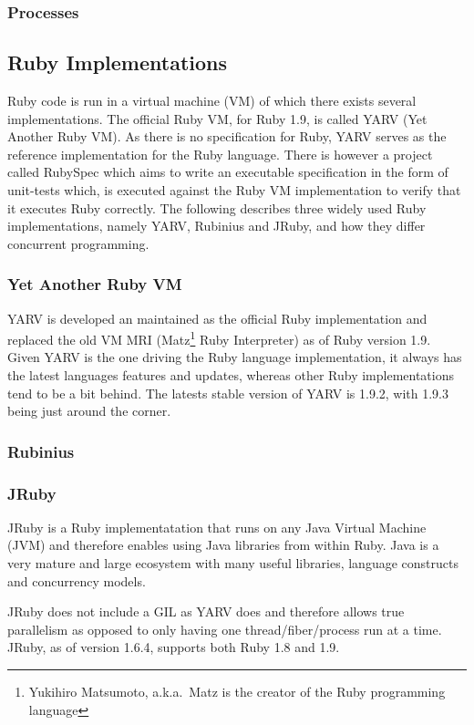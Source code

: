 \subsubsection{Processes}


\subsection{Ruby Implementations}
Ruby code is run in a virtual machine (VM) of which there exists several
implementations. The official Ruby VM, for Ruby 1.9, is called YARV (Yet 
Another Ruby VM). As there is no specification for Ruby, YARV serves as
the reference implementation for the Ruby language.  There is however a
project called RubySpec which aims to write an executable specification in the
form of unit-tests which, is executed against the Ruby VM implementation to
verify that it executes Ruby correctly. The following describes three widely
used Ruby implementations, namely YARV, Rubinius and JRuby, and how they
differ concurrent programming.

\subsubsection{Yet Another Ruby VM}
YARV is developed an maintained as the official Ruby implementation and replaced
the old VM MRI (Matz\footnote{Yukihiro Matsumoto, a.k.a.\ Matz is the creator of 
the Ruby programming language} Ruby Interpreter) as of Ruby version 1.9. Given
YARV is the one driving the Ruby language implementation, it always has the
latest languages features and updates, whereas other Ruby implementations tend
to be a bit behind. The latests stable version of YARV is 1.9.2, with 1.9.3
being just around the corner.

\subsubsection{Rubinius}

\subsubsection{JRuby}
JRuby is a Ruby implementatation that runs on any Java Virtual Machine (JVM)
and therefore enables using Java libraries from within Ruby. Java is a very
mature and large ecosystem with many useful libraries, language constructs and
concurrency models.

JRuby does not include a GIL as YARV does and therefore allows true
parallelism as opposed to only having one thread/fiber/process run at a time.
JRuby, as of version 1.6.4, supports both Ruby 1.8 and 1.9.


